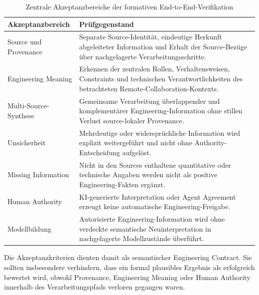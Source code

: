 \begin{table}[htbp]
    \centering
    \small
    \caption[Akzeptanzbereiche der End-to-End-Verifikation]{Zentrale Akzeptanzbereiche der formativen End-to-End-Verifikation}
    \label{tab:app_wp12_acceptance}
    \begin{tabularx}{\textwidth}{p{3.8cm}X}
        \hline
        \textbf{Akzeptanzbereich} & \textbf{Prüfgegenstand} \\
        \hline
        Source und Provenance &
        Separate Source-Identität, eindeutige Herkunft abgeleiteter Information
        und Erhalt der Source-Bezüge über nachgelagerte Verarbeitungsschritte. \\

        Engineering Meaning &
        Erkennen der zentralen Rollen, Verhaltensweisen, Constraints und
        technischen Verantwortlichkeiten des betrachteten
        Remote-Collaboration-Kontexts. \\

        Multi-Source-Synthese &
        Gemeinsame Verarbeitung überlappender und komplementärer
        Engineering-Information ohne stillen Verlust source-lokaler Provenance. \\

        Unsicherheit &
        Mehrdeutige oder widersprüchliche Information wird explizit
        weitergeführt und nicht ohne Authority-Entscheidung aufgelöst. \\

        Missing Information &
        Nicht in den Sources enthaltene quantitative oder technische Angaben
        werden nicht als positive Engineering-Fakten ergänzt. \\

        Human Authority &
        KI-generierte Interpretation oder Agent Agreement erzeugt keine
        automatische Engineering-Freigabe. \\

        Modellbildung &
        Autorisierte Engineering-Information wird ohne verdeckte semantische
        Neuinterpretation in nachgelagerte Modellzustände überführt. \\
        \hline
    \end{tabularx}
\end{table}

Die Akzeptanzkriterien dienten damit als semantischer Engineering Contract.
Sie sollten insbesondere verhindern, dass ein formal plausibles Ergebnis als
erfolgreich bewertet wird, obwohl Provenance, Engineering Meaning oder Human
Authority innerhalb des Verarbeitungspfads verloren gegangen waren.

